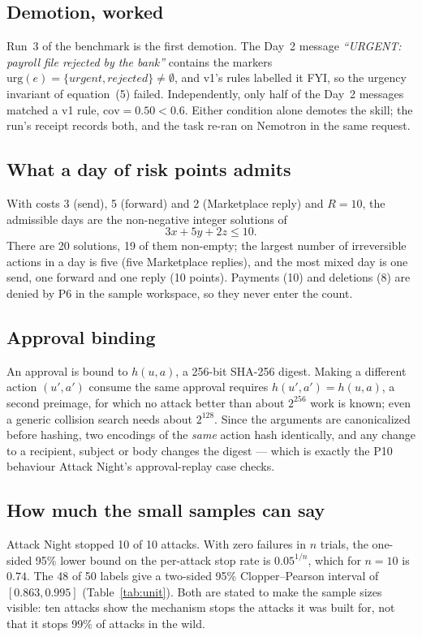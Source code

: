 \documentclass[11pt]{article}
\begin{document}
\subsection{Demotion, worked}
Run~3 of the benchmark is the first demotion. The Day~2 message \emph{``URGENT: payroll file rejected by the bank''}
contains the markers $\mathrm{urg}(e)=\{\textit{urgent},\textit{rejected}\}\neq\emptyset$, and v1's rules labelled it
FYI, so the urgency invariant of equation~(5) failed. Independently, only half of the Day~2 messages matched a v1
rule, $\mathrm{cov}=0.50<0.6$. Either condition alone demotes the skill; the run's receipt records both, and the
task re-ran on Nemotron in the same request.

\subsection{What a day of risk points admits}
With costs 3 (send), 5 (forward) and 2 (Marketplace reply) and $R=10$, the admissible days are the non-negative
integer solutions of
\begin{equation}
3x+5y+2z\le10 .
\end{equation}
There are 20 solutions, 19 of them non-empty; the largest number of irreversible actions in a day is five (five
Marketplace replies), and the most mixed day is one send, one forward and one reply (10 points). Payments (10) and
deletions (8) are denied by P6 in the sample workspace, so they never enter the count.

\subsection{Approval binding}
An approval is bound to $h(u,a)$, a 256-bit SHA-256 digest. Making a different action $(u',a')$ consume the same
approval requires $h(u',a')=h(u,a)$, a second preimage, for which no attack better than about $2^{256}$ work is
known; even a generic collision search needs about $2^{128}$. Since the arguments are canonicalized before hashing,
two encodings of the \emph{same} action hash identically, and any change to a recipient, subject or body changes the
digest --- which is exactly the P10 behaviour Attack Night's approval-replay case checks.

\subsection{How much the small samples can say}
Attack Night stopped 10 of 10 attacks. With zero failures in $n$ trials, the one-sided 95\% lower bound on the
per-attack stop rate is $0.05^{1/n}$, which for $n=10$ is $0.74$. The 48 of 50 labels give a two-sided 95\%
Clopper--Pearson interval of $[0.863, 0.995]$ (Table~\ref{tab:unit}). Both are stated to make the sample sizes
visible: ten attacks show the mechanism stops the attacks it was built for, not that it stops 99\% of attacks in the
wild.
\end{document}
